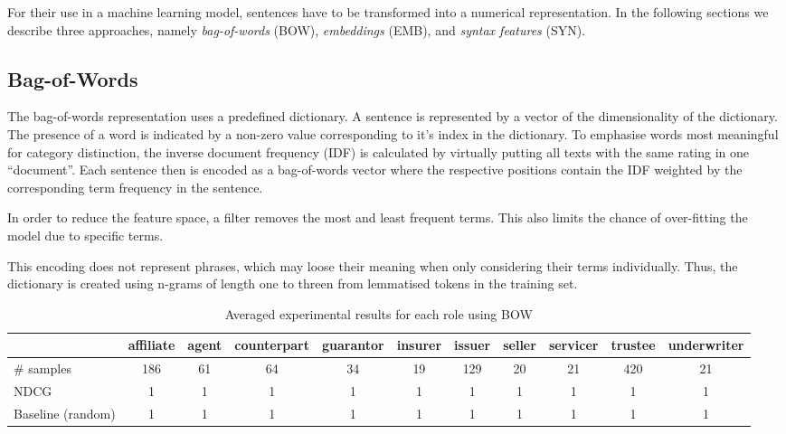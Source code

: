 
For their use in a machine learning model, sentences have to be transformed into a numerical representation.
In the following sections we describe three approaches, namely \textit{bag-of-words} (BOW), \textit{embeddings} (EMB), and \textit{syntax features} (SYN).


\subsection{Bag-of-Words}
The bag-of-words representation uses a predefined dictionary.
A sentence is represented by a vector of the dimensionality of the dictionary.
The presence of a word is indicated by a non-zero value corresponding to it's index in the dictionary.
To emphasise words most meaningful for category distinction, the inverse document frequency (IDF) is calculated by virtually putting all texts with the same rating in one ``document''. 
Each sentence then is encoded as a bag-of-words vector where the respective positions contain the IDF weighted by the corresponding term frequency in the sentence.

In order to reduce the feature space, a filter removes the most and least frequent terms.
This also limits the chance of over-fitting the model due to specific terms.

This encoding does not represent phrases, which may loose their meaning when only considering their terms individually.
Thus, the dictionary is created using n-grams of length one to threen from lemmatised tokens in the training set.
\begin{table*}
	\caption{Averaged experimental results for each role using BOW}
	\label{tab:roleresults}
	\begin{tabular}{lcccccccccc}
		\toprule
		& affiliate & agent & counterpart & guarantor & insurer & issuer & seller & servicer & trustee & underwriter \\
		\midrule
		\# samples & 186       & 61    & 64          & 34        & 19      & 129    & 20     & 21       & 420     & 21          \\
		NDCG & 1 & 1 & 1 & 1 & 1 & 1 & 1 & 1 & 1 & 1 \\
		Baseline (random) & 1 & 1 & 1 & 1 & 1 & 1 & 1 & 1 & 1 & 1 \\
		\bottomrule
	\end{tabular}
\end{table*}

